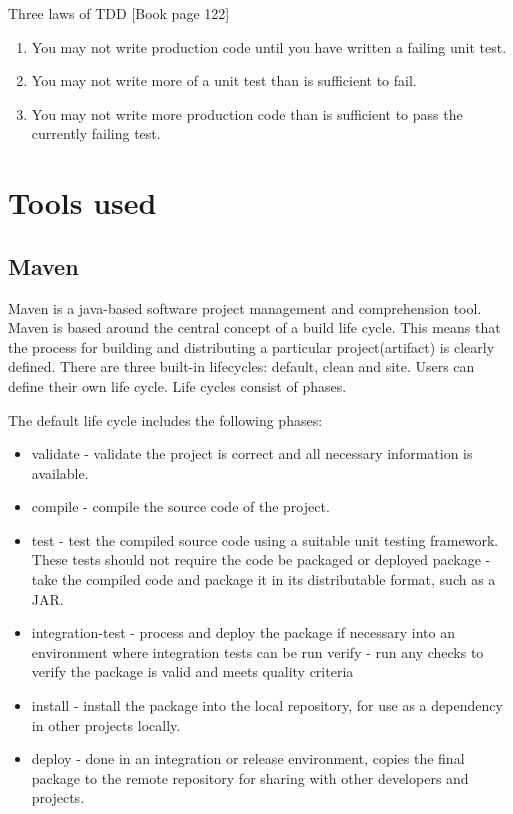       Three laws of TDD \cite[pp122]{Cleancode}[Book page 122]
        \begin{enumerate}
          \item You may not write production code until you have written a failing unit test.
          \item You may not write more of a unit test than is sufficient to fail.
          \item You may not write more production code than is sufficient to pass the currently failing test.
        \end{enumerate}
        
  \section {Tools used}
  \label{sec:toolsused}
  
  \subsection{Maven}
  Maven is a java-based software project management and comprehension tool.
  Maven is based around the central concept of a build life cycle. This means
  that the process for building and distributing a particular project(artifact) is clearly defined. There are three built-in lifecycles:
  default, clean and site. Users can define their own life cycle. Life cycles
  consist of phases.
   
  The default life cycle includes the following phases:
  \begin{itemize}
    \item validate - validate the project is correct and all necessary
    information is available.
    \item compile - compile the source code of the project.
    \item test - test the compiled source code using a suitable unit testing
    framework. These tests should not require the code be packaged or deployed
    package - take the compiled code and package it in its distributable format,
    such as a JAR.
    \item integration-test - process and deploy the package if necessary into an
    environment where integration tests can be run verify - run any checks to
    verify the package is valid and meets quality criteria
    \item install - install the package into the local repository, for use as a
      dependency in other projects locally.
    \item  deploy - done in an integration or
    release environment, copies the final package to the remote repository for
    sharing with other developers and projects.
  \end{itemize}
  
